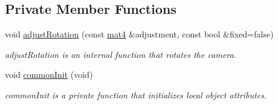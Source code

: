 \subsection*{Private Member Functions}
\begin{DoxyCompactItemize}
\item 
void \hyperlink{class_camera_aba32f195cdb5bfcfd05c2ce74315b6c3}{adjust\-Rotation} (const \hyperlink{class_angel_1_1mat4}{mat4} \&adjustment, const bool \&fixed=false)
\begin{DoxyCompactList}\small\item\em adjust\-Rotation is an internal function that rotates the camera. \end{DoxyCompactList}\item 
void \hyperlink{class_camera_a20243a7e3eb06ab1265118c5fb9cce9b}{common\-Init} (void)
\begin{DoxyCompactList}\small\item\em common\-Init is a private function that initializes local object attributes. \end{DoxyCompactList}\end{DoxyCompactItemize}
